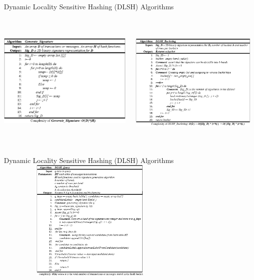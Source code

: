 \documentclass[11pt,aspectratio=169]{beamer}
\begin{document}
	\begin{frame}{ \small Dynamic Locality Sensitive Hashing (DLSH) Algorithms}
		\begin{columns}
			\includegraphics[width=\textwidth,height=169pt]{assets/Signature.png}
			
			\includegraphics[width=\textwidth,height=175pt]{assets/bucketing.png}
	\end{columns}
	\end{frame}

	\begin{frame}{ \small Dynamic Locality Sensitive Hashing (DLSH) Algorithms}
	\centering
	\includegraphics[width=0.7\textwidth,height=170pt]{assets/query.png}
	\end{frame}
\end{document}
